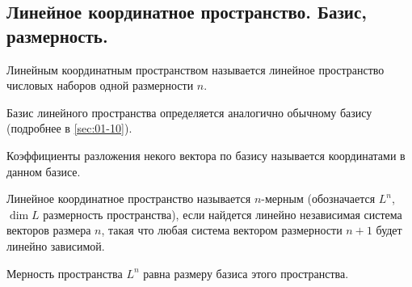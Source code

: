 \subsection{%
  Линейное координатное пространство. Базис, размерность.%
}

\begin{definition}
  Линейным координатным пространством называется линейное пространство числовых
  наборов одной размерности \(n\).
\end{definition}

\begin{remark}
  Базис линейного пространства определяется аналогично обычному базису
  (подробнее в \ref{sec:01-10}).
\end{remark}

\begin{definition}
  Коэффициенты разложения некого вектора по базису называется координатами в
  данном базисе.
\end{definition}

\begin{definition}
  Линейное координатное пространство называется \(n\)-мерным (обозначается
  \(L^n\), \(\dim L\) размерность пространства), если найдется линейно
  независимая система векторов размера \(n\), такая что любая система вектором
  размерности \(n + 1\) будет линейно зависимой.
\end{definition}

\begin{theorem}
  Мерность пространства \(L^n\) равна размеру базиса этого пространства.
\end{theorem}

